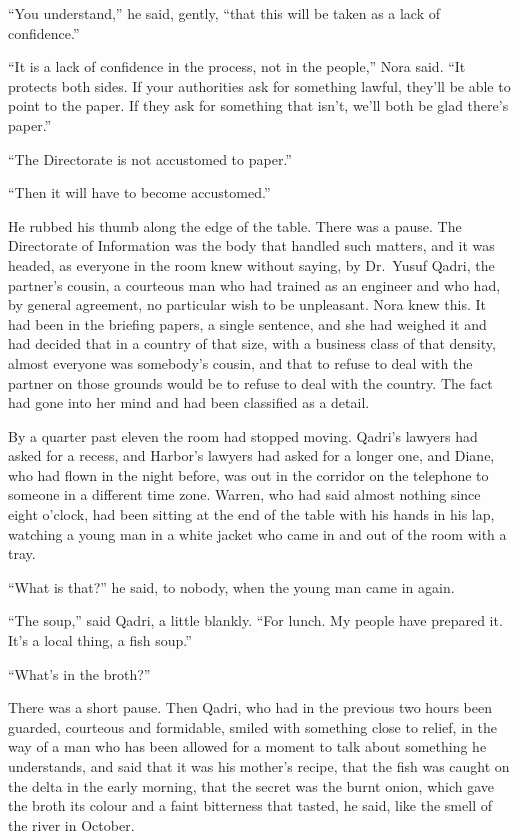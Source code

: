 ``You understand,'' he said, gently, ``that this will be taken as a lack of confidence.''

``It is a lack of confidence in the process, not in the people,'' Nora said. ``It protects both sides. If your authorities ask for something lawful, they'll be able to point to the paper. If they ask for something that isn't, we'll both be glad there's paper.''

``The Directorate is not accustomed to paper.''

``Then it will have to become accustomed.''

He rubbed his thumb along the edge of the table. There was a pause. The Directorate of Information was the body that handled such matters, and it was headed, as everyone in the room knew without saying, by Dr.~Yusuf Qadri, the partner's cousin, a courteous man who had trained as an engineer and who had, by general agreement, no particular wish to be unpleasant. Nora knew this. It had been in the briefing papers, a single sentence, and she had weighed it and had decided that in a country of that size, with a business class of that density, almost everyone was somebody's cousin, and that to refuse to deal with the partner on those grounds would be to refuse to deal with the country. The fact had gone into her mind and had been classified as a detail.

By a quarter past eleven the room had stopped moving. Qadri's lawyers had asked for a recess, and Harbor's lawyers had asked for a longer one, and Diane, who had flown in the night before, was out in the corridor on the telephone to someone in a different time zone. Warren, who had said almost nothing since eight o'clock, had been sitting at the end of the table with his hands in his lap, watching a young man in a white jacket who came in and out of the room with a tray.

``What is that?'' he said, to nobody, when the young man came in again.

``The soup,'' said Qadri, a little blankly. ``For lunch. My people have prepared it. It's a local thing, a fish soup.''

``What's in the broth?''

There was a short pause. Then Qadri, who had in the previous two hours been guarded, courteous and formidable, smiled with something close to relief, in the way of a man who has been allowed for a moment to talk about something he understands, and said that it was his mother's recipe, that the fish was caught on the delta in the early morning, that the secret was the burnt onion, which gave the broth its colour and a faint bitterness that tasted, he said, like the smell of the river in October.

